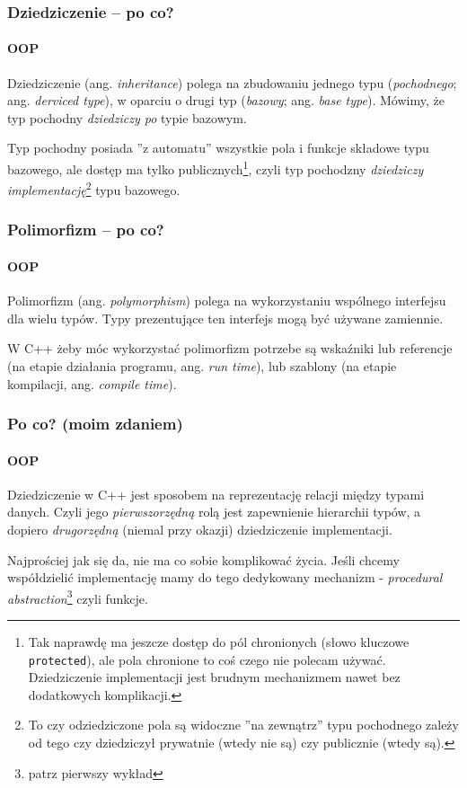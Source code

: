 \documentclass[aspectratio=169]{beamer}
\begin{document}
\begin{frame}
    \frametitle{Dziedziczenie -- po co?}
    \framesubtitle{OOP}

    Dziedziczenie (ang. \emph{inheritance}) polega na zbudowaniu jednego typu
    (\emph{pochodnego}; ang.  \emph{derviced type}), w oparciu o drugi typ
    (\emph{bazowy}; ang. \emph{base type}). Mówimy, że typ pochodny
    \emph{dziedziczy po} typie bazowym.

    \vspace{1em}

    Typ pochodny posiada ''z automatu'' wszystkie pola i funkcje składowe typu
    bazowego, ale dostęp ma tylko publicznych\footnote{Tak naprawdę ma jeszcze
    dostęp do pól chronionych (słowo kluczowe {\tt protected}), ale pola
    chronione to coś czego nie polecam używać. Dziedziczenie implementacji jest
    brudnym mechanizmem nawet bez dodatkowych komplikacji.}, czyli typ pochodzny
    \emph{dziedziczy implementację}\footnote{To czy odziedziczone pola są
    widoczne ''na zewnątrz'' typu pochodnego zależy od tego czy dziedziczył
    prywatnie (wtedy nie są) czy publicznie (wtedy są).} typu bazowego.
\end{frame}

\begin{frame}
    \frametitle{Polimorfizm -- po co?}
    \framesubtitle{OOP}

    Polimorfizm (ang. \emph{polymorphism}) polega na wykorzystaniu wspólnego
    interfejsu dla wielu typów. Typy prezentujące ten interfejs mogą być używane
    zamiennie.

    \vspace{1em}

    W C++ żeby móc wykorzystać polimorfizm potrzebe są wskaźniki lub referencje
    (na etapie działania programu, ang. \emph{run time}), lub szablony (na
    etapie kompilacji, ang. \emph{compile time}).
\end{frame}

\begin{frame}
    \frametitle{Po co? (moim zdaniem)}
    \framesubtitle{OOP}

    Dziedziczenie w C++ jest sposobem na reprezentację relacji między typami
    danych. Czyli jego \emph{pierwszorzędną} rolą jest zapewnienie hierarchii
    typów, a dopiero \emph{drugorzędną} (niemal przy okazji) dziedziczenie
    implementacji.



    \vspace{1em}

    Najprościej jak się da, nie ma co sobie komplikować życia. Jeśli chcemy
    współdzielić implementację mamy do tego dedykowany mechanizm -
    \emph{procedural abstraction}\footnote{patrz pierwszy wykład} czyli funkcje.
\end{frame}
\end{document}
